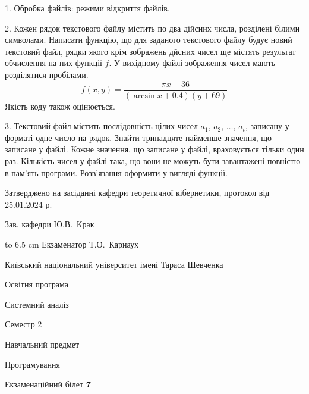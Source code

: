 \documentclass[12pt, ukrainian]{article}
\begin{document}
{%
1. Обробка файлів: режими відкриття файлів.%
\par
\vspace{2mm}

2. Кожен рядок текстового файлу містить по два дійсних числа, розділені білими символами.
Написати функцію, що для заданого текстового файлу будує новий текстовий файл, рядки якого крім зображень дйсних чисел ще містять результат обчислення на них функції $f$. У вихідному файлі зображення чисел мають розділятися пробілами. 
$$f(x, y) =\frac{\pi x + 36}{(\arcsin x + 0.4) (y + 69)}$$ 
Якість коду також оцінюється.

\par
\vspace{2mm}

3. Текстовий файл містить послідовність цілих чисел $a_1$, $a_2$, $\ldots$, $a_t$, записану у форматі одне число на рядок. Знайти тринадцяте найменше значення, що записане у файлі. Кожне значення, що записане у файлі, враховується тільки один раз. Кількість чисел у файлі така, що вони не можуть бути завантажені повністю в пам'ять програми. Розв'язання оформити у вигляді функції.

}
{\smallskip\smallskip \begin {scriptsize} Затверджено на засіданні кафедри теоретичної кібернетики, протокол   від   25.01.2024 р.\par\smallskip\smallskip\smallskip\smallskip
{\parbox {6.5 cm} {Зав. кафедри \dotfill Ю.В.~Крак}}\hspace {0.7cm} {\hbox to 6.5 cm { Екзаменатор \dotfill Т.О.~Карнаух}} \end{scriptsize}}
\newpage
{{\begin {scriptsize}\par
{ \center  Київський національний університет імені Тараса Шевченка \par}
{\parbox {5 cm}{Освітня програма \hfill}{\parbox {7 cm}{Системний аналіз\hfill}}\parbox {6 cm}{\hfill Семестр 2}}\par
{\parbox {5 cm} {Навчальний предмет \hfill}\parbox {7 cm}{Програмування \hfill}\parbox {6cm}{\hfill}\par}\vspace{-15pt} \end{scriptsize}}{\center Екзаменаційний білет \No \textbf { 7 }\par}}
\end{document}
